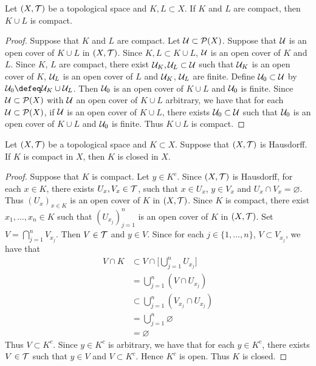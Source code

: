 \documentclass{book}
\begin{document}
	\begin{ex}
		Let $(X, \mathcal{T})$ be a topological space and $K, L \subset X$. If $K$ and $L$ are compact, then $K \cup L$ is compact. 
	\end{ex}
		
	\begin{proof}
		Suppose that $K$ and $L$ are compact. Let $\mathcal{U} \subset \mathcal{P}(X)$. Suppose that $\mathcal{U}$ is an open cover of $K \cup L$ in $(X, \mathcal{T})$. Since $K,L \subset K \cup L$, $\mathcal{U}$ is an open cover of $K$ and $L$. Since $K$, $L$ are compact, there exist $\mathcal{U}_K, \mathcal{U}_L \subset \mathcal{U}$ such that $\mathcal{U}_K$ is an open cover of $K$, $\mathcal{U}_L$ is an open cover of $L$ and $\mathcal{U}_K$, $\mathcal{U}_L$ are finite. Define $\mathcal{U}_0 \subset \mathcal{U}$ by $\MU_0 \defeq \MU_K \cup \MU_L$. Then $\mathcal{U}_0$ is an open cover of $K \cup L$ and $\mathcal{U}_0$ is finite. Since $\mathcal{U} \subset \mathcal{P}(X)$ with $\mathcal{U}$ an open cover of $K \cup L$ arbitrary, we have that for each $\mathcal{U} \subset \mathcal{P}(X)$, if $\mathcal{U}$ is an open cover of $K \cup L$, there exists $\mathcal{U}_0 \subset \mathcal{U}$ such that $\mathcal{U}_0$ is an open cover of $K \cup L$ and $\mathcal{U}_0$ is finite. Thus $K \cup L$ is compact. 
  	\end{proof}
	
	\begin{ex} 
		Let $(X, \mathcal{T})$ be a topological space and $K \subset X$. Suppose that $(X, \mathcal{T})$ is Hausdorff. If $K$ is compact in $X$, then $K$ is closed in $X$.
	\end{ex}

	\begin{proof}
		Suppose that $K$ is compact. Let $y \in K^c$. Since $(X, \mathcal{T})$ is Hausdorff, for each $x \in K$, there exists $U_x, V_x \in \mathcal{T}$, such that $x \in U_x$, $y \in V_x$ and $U_x \cap V_x = \varnothing$. Thus $(U_x)_{x \in K}$ is an open cover of $K$ in $(X, \mathcal{T})$. Since $K$ is compact, there exist $x_1, \ldots, x_n \in K$ such that $(U_{x_j})_{j=1}^n$ is an open cover of $K$ in $(X, \mathcal{T})$. Set $V = \bigcap\limits_{j=1}^n V_{x_j}$. Then $V \in \mathcal{T}$ and $y \in V$. Since for each $j \in \{1, \ldots, n\}$, $V \subset V_{x_j}$, we have that
		\begin{align*}
			V \cap K
			& \subset V \cap \bigg[ \bigcup_{j=1}^n U_{x_j} \bigg] \\
			& = \bigcup_{j=1}^n ( V \cap U_{x_j}) \\
			& \subset \bigcup_{j=1}^n (V_{x_j} \cap U_{x_j}) \\
			& = \bigcup_{j=1}^n \varnothing \\
			& = \varnothing
		\end{align*}
		Thus $V \subset K^c$. Since $y \in K^c$ is arbitrary, we have that for each $y \in K^c$, there exists $V \in \mathcal{T}$ such that $y \in V$ and $V \subset K^c$. Hence $K^c$ is open. Thus $K$ is closed.
	\end{proof}
	
\end{document}
